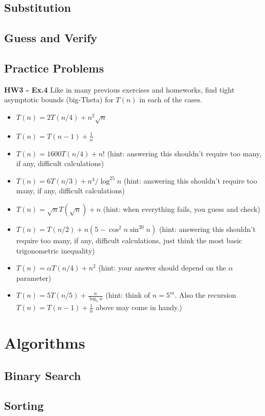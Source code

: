 \documentclass[12pt]{article}
\theoremstyle{definition}
\begin{document}
	\subsection{Substitution}

	\subsection{Guess and Verify}

	\subsection{Practice Problems}

	\noindent \textbf{HW3 - Ex.4} Like in many previous exercises and homeworks,
	find tight asymptotic bounds (big-Theta) for $T(n)$ in each of the cases.
	\begin{itemize}
		\item $T(n)=2T(n/4)+n^2\sqrt n$
		\item $T(n)=T(n-1)+\frac1n$
		\item $T(n)=1600T(n/4)+n!$ (hint: answering this shouldn't require too
			many, if any, difficult calculations) 
		\item $T(n)=6T(n/3)+n^4/\log^{25} n$ (hint: answering this shouldn't
			require too many, if any, difficult calculations)
		\item  $T(n)=\sqrt n T(\sqrt{n}) + n$ (hint: when everything fails, you
			guess and check)
		\item $T(n)=T(n/2)+n(5-\cos^2n\sin^{20}n)$ (hint: answering this shouldn't
			require too many, if any, difficult calculations, just think the most
			basic trigonometric inequality)
		\item $T(n)=\alpha T(n/4)+n^2$ (hint: your answer should depend on the
			$\alpha$ parameter)
		\item $T(n)=5T(n/5) +\frac{n}{\log_5 n}$ (hint: think of $n=5^m$. Also the
			recursion $T(n)=T(n-1)+\frac1n$ above may come in handy.)
	\end{itemize}

	\section{Algorithms}

	\subsection{Binary Search}

	\subsection{Sorting}
\end{document}
